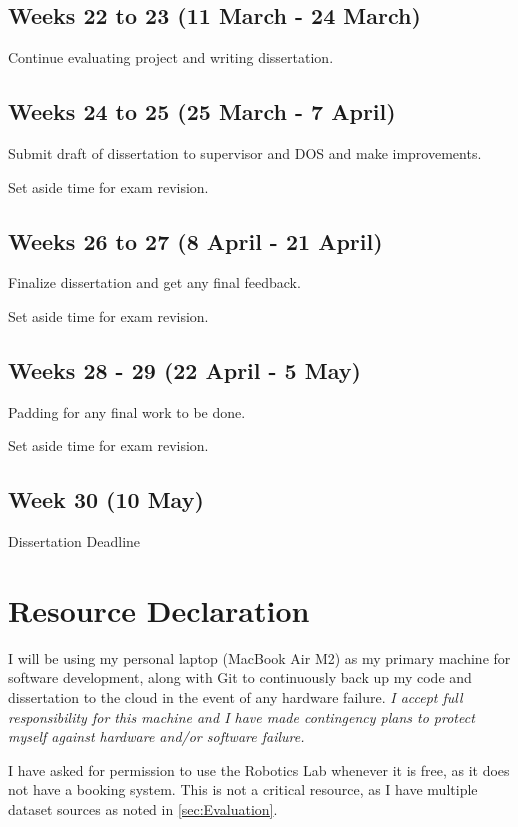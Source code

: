 \documentclass[12pt,a4paper,twoside]{article}
\begin{document}
\subsection*{Weeks 22 to 23 (11 March - 24 March)}
Continue evaluating project and writing dissertation.

\subsection*{Weeks 24 to 25 (25 March - 7 April)}
Submit draft of dissertation to supervisor and DOS and make improvements.

Set aside time for exam revision.

\subsection*{Weeks 26 to 27 (8 April - 21 April)}
Finalize dissertation and get any final feedback.

Set aside time for exam revision.

\subsection*{Weeks 28 - 29 (22 April - 5 May)}
Padding for any final work to be done.

Set aside time for exam revision.

\subsection*{Week 30 (10 May)}
Dissertation Deadline

\section{Resource Declaration}

I will be using my personal laptop (MacBook Air M2) as my primary machine for software development, along with Git to continuously back up my code and dissertation to the cloud in the event of any hardware failure. \textit{I accept full responsibility for this machine and I have made contingency plans to protect myself against hardware and/or software failure.}

I have asked for permission to use the Robotics Lab whenever it is free, as it does not have a booking system. This is not a critical resource, as I have multiple dataset sources as noted in \autoref{sec:Evaluation}.


\newpage

\printbibliography[heading=subbibliography]

\appendix
\end{document}
